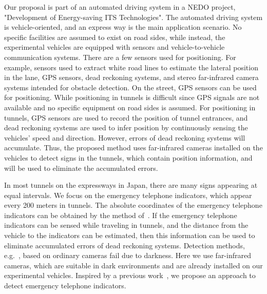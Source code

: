 \documentclass{JoITSRstyle}
\begin{document}
Our proposal is part of an automated driving system in a NEDO project, "Development of Energy-saving ITS Technologies".
{\color{red} The automated driving system is vehicle-oriented, and an express way is the main application scenario. No specific facilities are assumed to exist on road sides, while instead, the experimental vehicles are equipped with  sensors and vehicle-to-vehicle communication systems. There are a few sensors used for positioning. For example, sensors used to extract white road lines to estimate the lateral position in the lane, GPS sensors, dead reckoning systems, and stereo far-infrared camera systems intended for obstacle detection. On the street, GPS sensors can be used for positioning. While positioning in tunnels is difficult since GPS signals are not available and no specific equipment on road sides is assumed. For positioning in tunnels, GPS sensors are used to record the position of  tunnel entrances, and dead reckoning systems are used to infer position by continuously sensing the vehicles' speed and direction. However, errors of dead reckoning systems will accumulate. Thus, the proposed method uses far-infrared cameras installed on the vehicles to detect signs in the tunnels, which contain position information, and will be used to eliminate the accumulated errors. }

In most tunnels   on the expressways in Japan, there are many signs appearing at equal intervals. We focus on the emergency telephone indicators, which appear every 200 meters in tunnels. The absolute coordinates of the emergency telephone indicators can be obtained by the method of~\cite{xue}.  If the emergency telephone indicators can be sensed while traveling in tunnels, and the distance from the vehicle to the indicators can be estimated,  then this information  can be used to eliminate accumulated errors of dead reckoning systems.
Detection methods, e.g.~\cite{ac23}, based on ordinary cameras fail due to darkness. Here we use far-infrared cameras,  which are suitable in dark environments and are already installed on our experimental vehicles. Inspired by a previous work~\cite{wang1}, we propose an approach to detect emergency telephone indicators.
\end{document}
